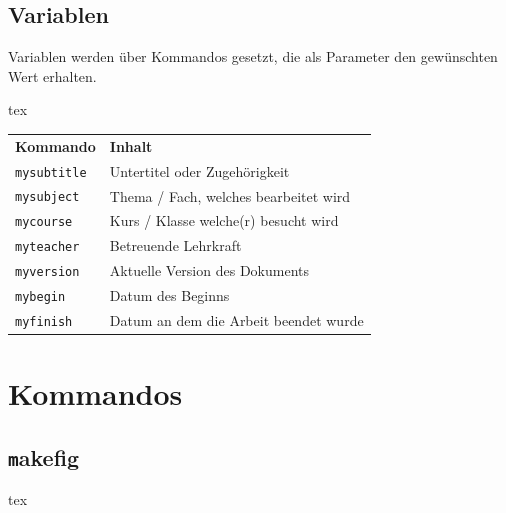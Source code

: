 \subsection{Variablen}
Variablen werden über Kommandos gesetzt, die als Parameter den gewünschten Wert erhalten.
\begin{code}{tex}
\end{code}

\begin{tabular}{l l}
\textbf{Kommando} & \textbf{Inhalt}\\

{\small \verb|mysubtitle|} 	& Untertitel oder Zugehörigkeit\\
{\small \verb|mysubject|} 	& Thema / Fach, welches bearbeitet wird\\
{\small \verb|mycourse|} 	& Kurs / Klasse welche(r) besucht wird\\
{\small \verb|myteacher|} 	& Betreuende Lehrkraft\\
{\small \verb|myversion|} 	& Aktuelle Version des Dokuments\\
{\small \verb|mybegin|} 	& Datum des Beginns\\
{\small \verb|myfinish|} 	& Datum an dem die Arbeit beendet wurde
\end{tabular}

\newpage
\section{Kommandos}\label{sec:Kommandos}
\subsection{\texttt makefig}

\begin{listing}
\begin{code}{tex}
\end{code}
\caption{\texttt makefig}
\label{lst:makefig}
\end{listing}

